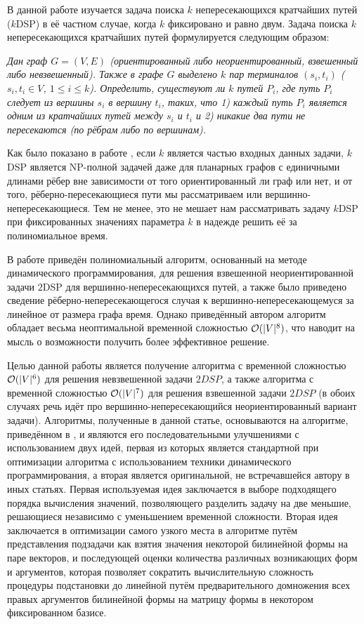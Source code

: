 \Introduction

В данной работе изучается задача поиска $k$ непересекающихся кратчайших путей ($k$DSP) в её частном случае, когда $k$ фиксировано и равно двум. Задача поиска $k$ непересекающихся кратчайших путей формулируется следующим образом:

\emph{Дан граф $G = (V, E)$ (ориентированный либо неориентированный, взвешенный либо невзвешенный). Также в графе $G$ выделено $k$ пар терминалов $(s_i, t_i)$ ($s_i, t_i \in V$, $1 \leq i \leq k$). Определить, существуют ли $k$ путей $P_i$, где путь $P_i$ следует из вершины $s_i$ в вершину $t_i$, таких, что 1) каждый путь $P_i$ является одним из кратчайших путей между $s_i$ и $t_i$ и 2) никакие два пути не пересекаются (по рёбрам либо по вершинам).}

Как было показано в работе \cite{ET}, если $k$ является частью входных данных задачи, $k$DSP является NP-полной задачей даже для планарных графов с единичными длинами рёбер вне зависимости от того ориентированный ли граф или нет, и от того, рёберно-пересекающиеся пути мы рассматриваем или вершинно-непересекающиеся. Тем не менее, это не мешает нам рассматривать задачу $k$DSP при фиксированных значениях параметра $k$ в надежде решить её за полиномиальное время. 

В работе \cite{ET} приведён полиномиальный алгоритм, основанный на методе динамического программирования, для решения взвешенной неориентированной задачи $2$DSP для вершинно-непересекающихся путей, а также было приведено сведение рёберно-непересекающегося случая к вершинно-непересекающемуся за линейное от размера графа время. Однако приведённый автором алгоритм обладает весьма неоптимальной временной сложностью $\mathcal{O}(|V|^8)$, что наводит на мысль о возможности получить более эффективное решение.

Целью данной работы является получение алгоритма с временной сложностью $\mathcal{O}(|V|^6)$ для решения невзвешенной задачи $2DSP$, а также алгоритма с временной сложностью $\mathcal{O}(|V|^7)$ для решения взвешенной задачи $2DSP$ (в обоих случаях речь идёт про вершинно-непересекающийся неориентированный вариант задачи). Алгоритмы, полученные в данной статье, основываются на алгоритме, приведённом в \cite{ET}, и являются его последовательными улучшениями с использованием двух идей, первая из которых является стандартной при оптимизации алгоритма с использованием техники динамического программирования, а вторая является оригинальной, не встречавшейся автору в иных статьях. Первая используемая идея заключается в выборе подходящего порядка вычисления значений, позволяющего разделить задачу на две меньшие, решающиеся независимо с уменьшением временной сложности. Вторая идея заключается в оптимизации самого узкого места в алгоритме путём представления подзадачи как взятия значения некоторой билинейной формы на паре векторов, и последующей оценки количества различных возникающих форм и аргументов, которая позволяет сократить вычислительную сложность процедуры подстановки до линейной путём предварительного домножения всех правых аргументов билинейной формы на матрицу формы в некотором фиксированном базисе.

